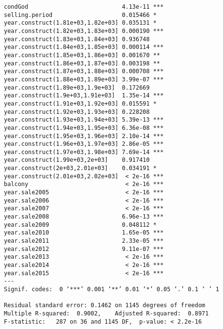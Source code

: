 \begin{lstlisting}
condGod                           4.13e-11 ***
selling.period                    0.015466 *  
year.construct(1.81e+03,1.82e+03] 0.035131 *  
year.construct(1.82e+03,1.83e+03] 0.000190 ***
year.construct(1.83e+03,1.84e+03] 0.936748    
year.construct(1.84e+03,1.85e+03] 0.000114 ***
year.construct(1.85e+03,1.86e+03] 0.001670 ** 
year.construct(1.86e+03,1.87e+03] 0.003198 ** 
year.construct(1.87e+03,1.88e+03] 0.000708 ***
year.construct(1.88e+03,1.89e+03] 3.99e-07 ***
year.construct(1.89e+03,1.9e+03]  0.172669    
year.construct(1.9e+03,1.91e+03]  1.35e-14 ***
year.construct(1.91e+03,1.92e+03] 0.015591 *  
year.construct(1.92e+03,1.93e+03] 0.228208    
year.construct(1.93e+03,1.94e+03] 5.39e-13 ***
year.construct(1.94e+03,1.95e+03] 6.36e-08 ***
year.construct(1.95e+03,1.96e+03] 2.10e-14 ***
year.construct(1.96e+03,1.97e+03] 2.86e-05 ***
year.construct(1.97e+03,1.98e+03] 7.69e-14 ***
year.construct(1.99e+03,2e+03]    0.917410    
year.construct(2e+03,2.01e+03]    0.034191 *  
year.construct(2.01e+03,2.02e+03]  < 2e-16 ***
balcony                            < 2e-16 ***
year.sale2005                      < 2e-16 ***
year.sale2006                      < 2e-16 ***
year.sale2007                      < 2e-16 ***
year.sale2008                     6.96e-13 ***
year.sale2009                     0.048112 *  
year.sale2010                     1.65e-05 ***
year.sale2011                     2.33e-05 ***
year.sale2012                     9.11e-07 ***
year.sale2013                      < 2e-16 ***
year.sale2014                      < 2e-16 ***
year.sale2015                      < 2e-16 ***
---
Signif. codes:  0 ‘***’ 0.001 ‘**’ 0.01 ‘*’ 0.05 ‘.’ 0.1 ‘ ’ 1

Residual standard error: 0.1462 on 1145 degrees of freedom
Multiple R-squared:  0.9002,	Adjusted R-squared:  0.8971 
F-statistic:   287 on 36 and 1145 DF,  p-value: < 2.2e-16
\end{lstlisting}

